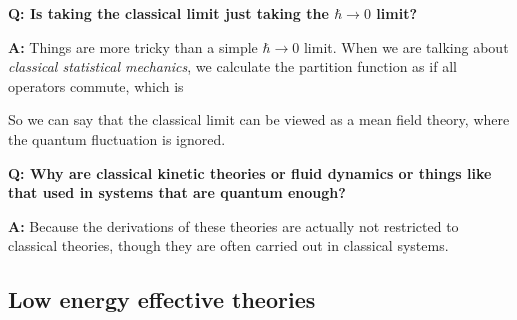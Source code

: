 \documentclass[hyperref, a4paper]{article}
\newenvironment{qanda}{\setlength{\parindent}{0pt}}{\bigskip}
\newcommand{\Q}{\bigskip\bfseries Q: }
\newcommand{\A}{\par\textbf{A:} \normalfont}
\begin{document}
\begin{qanda}

\Q Is taking the classical limit just taking the $\hbar \to 0$ limit?
\A Things are more tricky than a simple $\hbar \to 0$ limit. When we are talking about \emph{classical statistical mechanics}, we calculate the partition function as if all operators commute, which is %

So we can say that the classical limit can be viewed as a mean field theory, where the quantum fluctuation 
is ignored.

\Q Why are classical kinetic theories or fluid dynamics or things like that used in systems that are quantum enough?
\A Because the derivations of these theories are actually not restricted to classical theories, though they are often carried out in classical systems.

\end{qanda}

\subsection{Low energy effective theories}
\end{document}
